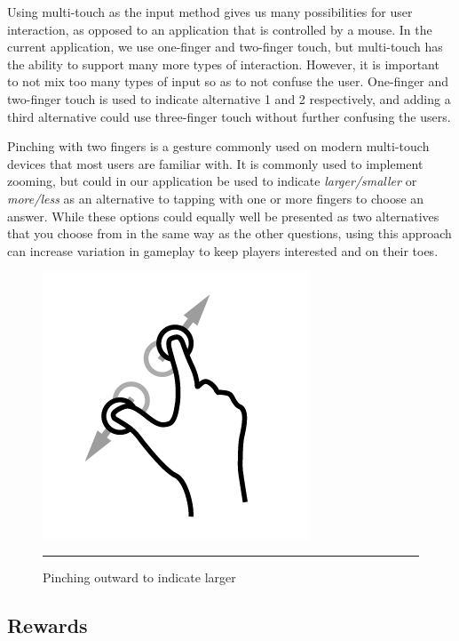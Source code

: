 Using multi-touch as the input method gives us many possibilities for user interaction, as opposed to an application that is controlled by a mouse. In the current application, we use one-finger and two-finger touch, but multi-touch has the ability to support many more types of interaction. However, it is important to not mix too many types of input so as to not confuse the user. One-finger and two-finger touch is used to indicate alternative 1 and 2 respectively, and adding a third alternative could use three-finger touch without further confusing the users.

Pinching with two fingers is a gesture commonly used on modern multi-touch devices that most users are familiar with. It is commonly used to implement zooming, but could in our application be used to indicate \emph{larger/smaller} or \emph{more/less} as an alternative to tapping with one or more fingers to choose an answer. While these options could equally well be presented as two alternatives that you choose from in the same way as the other questions, using this approach can increase variation in gameplay to keep players interested and on their toes.

\begin{figure}[htbp]
	\centering
	\includegraphics{./Figures/pinch.png}
	\rule{35em}{0.5pt}
	\caption[Pinch]{Pinching outward to indicate larger}
	\label{fig:Pinch}
\end{figure}


\subsection{Rewards}

